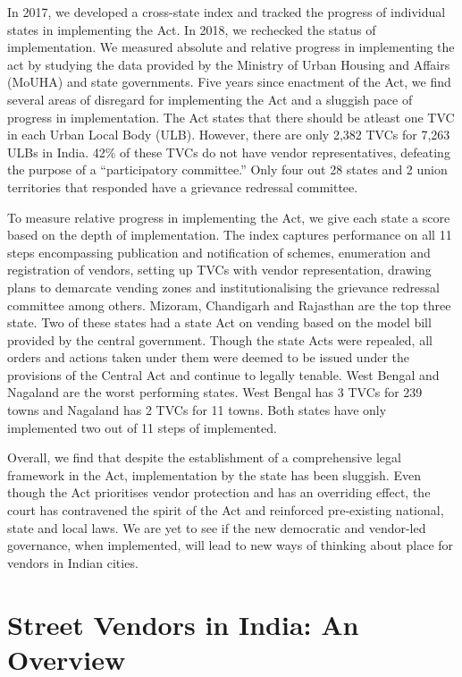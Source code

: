 \documentclass[a4paper, 12pt, twoside]{article}
\begin{document}
In 2017, we developed a cross-state index and tracked the progress of individual states in implementing the Act. In 2018, we rechecked the status of implementation. We measured absolute and relative progress in implementing the act by studying the data provided by the Ministry of Urban Housing and Affairs (MoUHA) and state governments. Five years since enactment of the Act, we find several areas of disregard for implementing the Act and a sluggish pace of progress in implementation. The Act states that there should be atleast one TVC in each Urban Local Body (ULB). However, there are only 2,382 TVCs for 7,263 ULBs in India. 42\% of these TVCs do not have vendor representatives, defeating the purpose of a “participatory committee.” Only four out 28 states and 2 union territories that responded have a grievance redressal committee.

To measure relative progress in implementing the Act, we give each state a score based on the depth of implementation. The index captures performance on all 11 steps encompassing publication and notification of schemes, enumeration and registration of vendors, setting up TVCs with vendor representation, drawing plans to demarcate vending zones and institutionalising the grievance redressal committee among others. Mizoram, Chandigarh and Rajasthan are the top three state. Two of these states had a state Act on vending based on the model bill provided by the central government. Though the state Acts were repealed, all orders and actions taken under them were deemed to be issued under the provisions of the Central Act and continue to legally tenable. West Bengal and Nagaland are the worst performing states. West Bengal has 3 TVCs for 239 towns and Nagaland has 2 TVCs for 11 towns. Both states have only implemented two out of 11 steps of implemented.




Overall, we find that despite the establishment of a comprehensive legal framework in the Act, implementation by the state has been sluggish. Even though the Act prioritises vendor protection and has an overriding effect, the court has contravened the spirit of the Act and reinforced pre-existing national, state and local laws. We are yet to see if the new democratic and vendor-led governance, when implemented, will lead to new ways of thinking about place for vendors in Indian cities.


\newpage
\section*{Street Vendors in India: An Overview}
\end{document}
